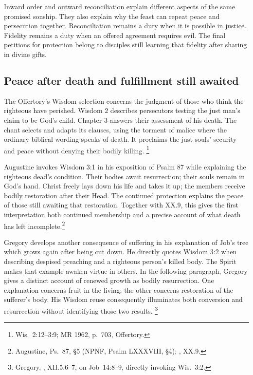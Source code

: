 Inward order and outward reconciliation explain different
aspects of the same promised sonship. They also explain
why the feast can repeat peace and persecution together.
Reconciliation remains a duty when it is possible in
justice. Fidelity remains a duty when an offered agreement
requires evil. The final petitions for protection belong
to disciples still learning that fidelity after sharing
in divine gifts.

\subsection{Peace after death and fulfillment still awaited}
The Offertory's Wisdom selection concerns the judgment of
those who think the righteous have perished. Wisdom 2
describes persecutors testing the just man's claim to
be God's child. Chapter 3 answers their assessment of
his death. The chant selects and adapts its clauses,
using the torment of malice where the ordinary biblical
wording speaks of death. It proclaims the just souls'
security and peace without denying their bodily killing.
\footnote{Wis.~2:12--3:9; MR 1962, p.~703, Offertory.}

Augustine invokes Wisdom 3:1 in his exposition of Psalm 87
while explaining the righteous dead's condition. Their
bodies await resurrection; their souls remain in God's
hand. Christ freely lays down his life and takes it up;
the members receive bodily restoration after their Head.
The continued protection explains the peace of those
still awaiting that restoration. Together with
 XX.9, this gives the first
interpretation both continued membership and a precise
account of what death has left incomplete.\footnote{Augustine,
Ps.~87, \S5 (NPNF, Psalm LXXXVIII, \S4);
, XX.9.}

Gregory develops another consequence of suffering in his
explanation of Job's tree which grows again after being
cut down. He directly quotes Wisdom 3:2 when describing
despised preaching and a righteous person's killed body.
The Spirit makes that example awaken virtue in others.
In the following paragraph, Gregory gives a distinct
account of renewed growth as bodily resurrection.
One explanation concerns fruit in the living; the other
concerns restoration of the sufferer's body. His Wisdom
reuse consequently illuminates both conversion and
resurrection without identifying those two results.
\footnote{Gregory, , XII.5.6--7,
on Job~14:8--9, directly invoking Wis.~3:2.}

